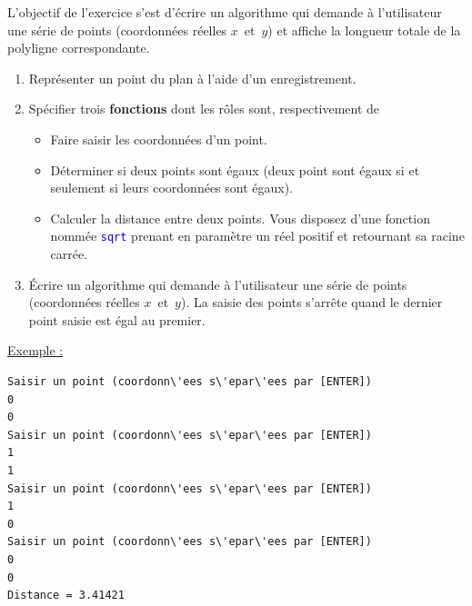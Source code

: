 \documentclass[11pt]{exam}
\begin{document}
\begin{questions}

\question L'objectif de l'exercice s'est d'\'ecrire un algorithme qui demande \`a l'utilisateur une s\'erie de points (coordonn\'ees r\'eelles $x$~et~$y$) et affiche la longueur totale de la polyligne correspondante.
\begin{enumerate}[label=\alph*)]
\item Repr\'esenter un point du plan \`a l'aide d'un enregistrement. 
\item Sp\'ecifier trois {\bf fonctions} dont les r\^oles sont, respectivement de
\begin{itemize}
\item Faire saisir les coordonn\'ees d'un point.
\item D\'eterminer si deux points sont \'egaux (deux point sont \'egaux si et seulement si leurs coordonn\'ees sont \'egaux). 
\item Calculer la distance entre deux points. Vous disposez d'une fonction nomm\'ee \textcolor{blue}{\texttt{sqrt}} prenant en param\`etre un r\'eel positif et retournant sa racine carr\'ee.
\end{itemize}
\item \'Ecrire un algorithme qui demande \`a l'utilisateur une s\'erie de points (coordonn\'ees r\'eelles $x$~et~$y$). La saisie des points s'arr\^ete quand le dernier point saisie est \'egal au premier.
\end{enumerate}

\underline{Exemple :} 

\begin{Verbatim}
Saisir un point (coordonn\'ees s\'epar\'ees par [ENTER])
0
0
Saisir un point (coordonn\'ees s\'epar\'ees par [ENTER])
1
1
Saisir un point (coordonn\'ees s\'epar\'ees par [ENTER])
1
0
Saisir un point (coordonn\'ees s\'epar\'ees par [ENTER])
0
0
Distance = 3.41421
\end{Verbatim}

\end{questions}
\end{document}

